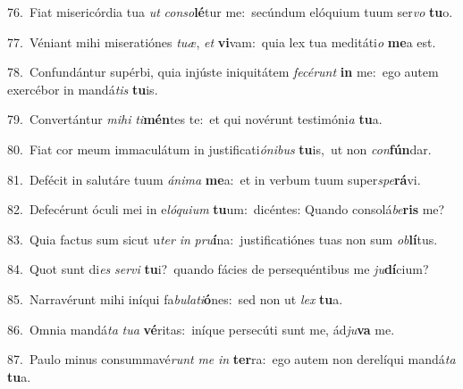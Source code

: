 {\numbfont\textcolor{\numbcolor}{76.}}~Fiat misericórdia tua \textit{ut} \textit{con}\-\textit{so}\textbf{lé}tur me:~\star secúndum elóquium tuum ser\textit{vo} \textbf{tu}\-o.\par
{\numbfont\textcolor{\numbcolor}{77.}}~Véniant mihi miseratiónes \textit{tu}\-\textit{æ}, \textit{et} \textbf{vi}\-vam:~\star quia lex tua meditáti\textit{o} \textbf{me}\-a est.\par
{\numbfont\textcolor{\numbcolor}{78.}}~Confundántur supérbi, quia injúste iniquitátem \textit{fe}\-\textit{cé}\textit{runt} \textbf{in} me:~\star ego autem exercébor in mandá\textit{tis} \textbf{tu}\-is.\par
{\numbfont\textcolor{\numbcolor}{79.}}~Convertántur \textit{mi}\-\textit{hi} \textit{ti}\-\textbf{mén}tes te:~\star et qui novérunt testimóni\textit{a} \textbf{tu}\-a.\par
{\numbfont\textcolor{\numbcolor}{80.}}~Fiat cor meum immaculátum in justificati\-\textit{ó}\-\textit{ni}\textit{bus} \textbf{tu}\-is,~\star ut non \textit{con}\-\textbf{fún}dar.\par
{\numbfont\textcolor{\numbcolor}{81.}}~Defécit in salutáre tuum \textit{á}\-\textit{ni}\textit{ma} \textbf{me}\-a:~\star et in verbum tuum super\-\textit{spe}\-\textbf{rá}vi.\par
{\numbfont\textcolor{\numbcolor}{82.}}~Defecérunt óculi mei in e\-\textit{ló}\-\textit{qui}\textit{um} \textbf{tu}\-um:~\star dicéntes: Quando consolá\-\textit{be}\-\textbf{ris} me?\par
{\numbfont\textcolor{\numbcolor}{83.}}~Quia factus sum sicut u\textit{ter} \textit{in} \textit{pru}\-\textbf{í}na:~\star justificatiónes tuas non sum \textit{ob}\-\textbf{lí}tus.\par
{\numbfont\textcolor{\numbcolor}{84.}}~Quot sunt di\textit{es} \textit{ser}\-\textit{vi} \textbf{tu}\-i?~\star quando fácies de persequéntibus me \textit{ju}\-\textbf{dí}cium?\par
{\numbfont\textcolor{\numbcolor}{85.}}~Narravérunt mihi iníqui fa\-\textit{bu}\-\textit{la}\textit{ti}\textbf{ó}nes:~\star sed non ut \textit{lex} \textbf{tu}\-a.\par
{\numbfont\textcolor{\numbcolor}{86.}}~Omnia mandá\textit{ta} \textit{tu}\-\textit{a} \textbf{vé}\-ritas:~\star iníque persecúti sunt me, ád\-\textit{ju}\-\textbf{va} me.\par
{\numbfont\textcolor{\numbcolor}{87.}}~Paulo minus consummavé\textit{runt} \textit{me} \textit{in} \textbf{ter}\-ra:~\star ego autem non derelíqui mandá\textit{ta} \textbf{tu}\-a.\par
